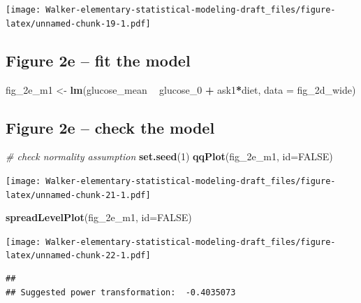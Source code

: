 \documentclass[]{book}
\newenvironment{Shaded}{\begin{snugshade}}{\end{snugshade}}
\newcommand{\CommentTok}[1]{\textcolor[rgb]{0.56,0.35,0.01}{\textit{#1}}}
\newcommand{\DataTypeTok}[1]{\textcolor[rgb]{0.13,0.29,0.53}{#1}}
\newcommand{\DecValTok}[1]{\textcolor[rgb]{0.00,0.00,0.81}{#1}}
\newcommand{\KeywordTok}[1]{\textcolor[rgb]{0.13,0.29,0.53}{\textbf{#1}}}
\newcommand{\NormalTok}[1]{#1}
\newcommand{\OperatorTok}[1]{\textcolor[rgb]{0.81,0.36,0.00}{\textbf{#1}}}
\newcommand{\OtherTok}[1]{\textcolor[rgb]{0.56,0.35,0.01}{#1}}
\newcommand{\StringTok}[1]{\textcolor[rgb]{0.31,0.60,0.02}{#1}}
\begin{document}
\texttt{[image: Walker-elementary-statistical-modeling-draft\_files/figure-latex/unnamed-chunk-19-1.pdf]}

\hypertarget{figure-2e-fit-the-model}{%
\subsection{Figure 2e -- fit the model}\label{figure-2e-fit-the-model}}

\begin{Shaded}
\begin{Highlighting}[]
\NormalTok{fig_2e_m1 <-}\StringTok{ }\KeywordTok{lm}\NormalTok{(glucose_mean }\OperatorTok{~}\StringTok{ }\NormalTok{glucose_}\DecValTok{0} \OperatorTok{+}\StringTok{ }\NormalTok{ask1}\OperatorTok{*}\NormalTok{diet, }\DataTypeTok{data =}\NormalTok{ fig_2d_wide)}
\end{Highlighting}
\end{Shaded}

\hypertarget{figure-2e-check-the-model}{%
\subsection{Figure 2e -- check the model}\label{figure-2e-check-the-model}}

\begin{Shaded}
\begin{Highlighting}[]
\CommentTok{# check normality assumption}
\KeywordTok{set.seed}\NormalTok{(}\DecValTok{1}\NormalTok{)}
\KeywordTok{qqPlot}\NormalTok{(fig_2e_m1, }\DataTypeTok{id=}\OtherTok{FALSE}\NormalTok{)}
\end{Highlighting}
\end{Shaded}

\texttt{[image: Walker-elementary-statistical-modeling-draft\_files/figure-latex/unnamed-chunk-21-1.pdf]}

\begin{Shaded}
\begin{Highlighting}[]
\KeywordTok{spreadLevelPlot}\NormalTok{(fig_2e_m1, }\DataTypeTok{id=}\OtherTok{FALSE}\NormalTok{)}
\end{Highlighting}
\end{Shaded}

\texttt{[image: Walker-elementary-statistical-modeling-draft\_files/figure-latex/unnamed-chunk-22-1.pdf]}

\begin{verbatim}
## 
## Suggested power transformation:  -0.4035073
\end{verbatim}
\end{document}

